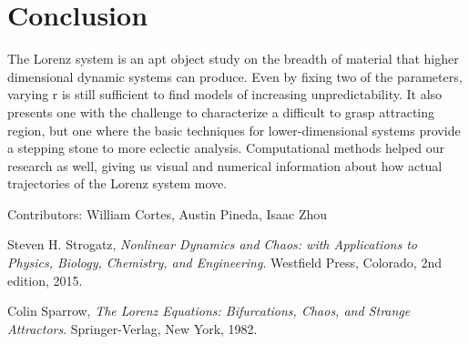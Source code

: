 \documentclass{report}
\begin{document}
\section*{Conclusion}

The Lorenz system is an apt object study on the breadth of material that higher
dimensional dynamic systems can produce. Even by fixing two of the parameters,
varying r is still sufficient to find models of increasing unpredictability.
It also presents one with the challenge to characterize a difficult to grasp
attracting region, but one where the basic techniques for lower-dimensional
systems provide a stepping stone to more eclectic analysis. Computational
methods helped our research as well, giving us visual and numerical information
about how actual trajectories of the Lorenz system move.

Contributors: William Cortes, Austin Pineda, Isaac Zhou

\begin{thebibliography}{9}
  Steven H. Strogatz,
  \emph{Nonlinear Dynamics and Chaos: with Applications to Physics, Biology,
Chemistry, and Engineering}.
  Westfield Press, Colorado,
  2nd edition,
  2015.

  Colin Sparrow,
  \emph{The Lorenz Equations: Bifurcations, Chaos, and Strange Attractors}.
  Springer-Verlag, New York,
  1982.
\end{thebibliography}
\end{document}
